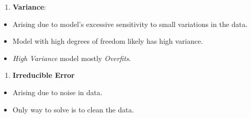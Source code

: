 \documentclass[
]{report}
\providecommand{\tightlist}{%
  \setlength{\itemsep}{0pt}\setlength{\parskip}{0pt}}\usepackage{longtable,booktabs,array}
\begin{document}
\begin{enumerate}
\def\labelenumi{\arabic{enumi}.}
\setcounter{enumi}{1}
\tightlist
\item
  \textbf{Variance}:
\end{enumerate}

\begin{itemize}
\tightlist
\item
  Arising due to model's excessive sensitivity to small variations in
  the data.
\item
  Model with high degrees of freedom likely has high variance.
\item
  \emph{High Variance} model mostly \emph{Overfits}.
\end{itemize}

\begin{enumerate}
\def\labelenumi{\arabic{enumi}.}
\setcounter{enumi}{2}
\tightlist
\item
  \textbf{Irreducible Error}
\end{enumerate}

\begin{itemize}
\tightlist
\item
  Arising due to noise in data.
\item
  Only way to solve is to clean the data.
\end{itemize}
\end{document}
